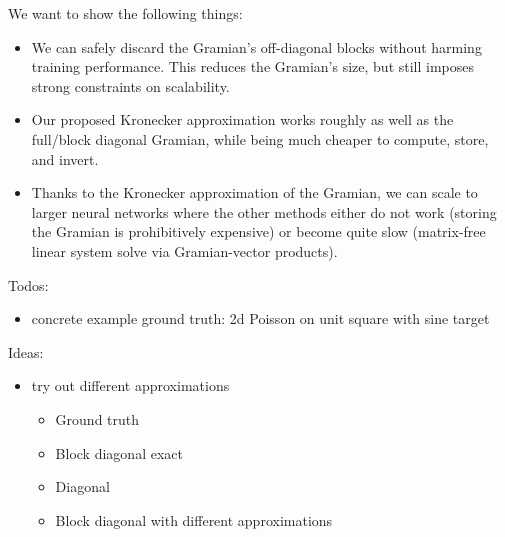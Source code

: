 We want to show the following things:
\begin{itemize}
\item We can safely discard the Gramian's off-diagonal blocks without harming
  training performance. This reduces the Gramian's size, but still imposes
  strong constraints on scalability.

\item Our proposed Kronecker approximation works roughly as well as the
  full/block diagonal Gramian, while being much cheaper to compute, store, and
  invert.

\item Thanks to the Kronecker approximation of the Gramian, we can scale to larger neural networks where the other methods either do not work (storing the Gramian is prohibitively expensive) or become quite slow (matrix-free linear system solve via Gramian-vector products).
\end{itemize}

Todos:
\begin{itemize}
\item concrete example ground truth: 2d Poisson on unit square with sine target
\end{itemize}

Ideas:
\begin{itemize}
\item try out different approximations
  \begin{itemize}
  \item Ground truth
  \item Block diagonal exact
  \item Diagonal
  \item Block diagonal with different approximations
  \end{itemize}
\end{itemize}

